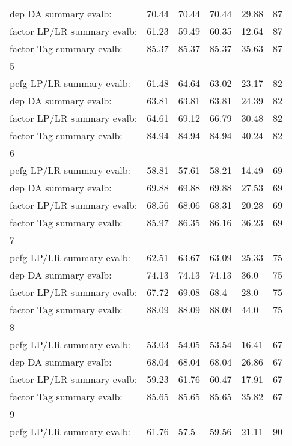 \begin{longtable}{|p{}|p{}|p{}|p{}|p{}|p{}|}
    dep DA summary evalb:  &  70.44  &  70.44  &  70.44  &  29.88  &  87\\
    factor LP/LR summary evalb:  &  61.23  &  59.49  &  60.35  &  12.64  &  87\\
    factor Tag summary evalb:  &  85.37  &  85.37  &  85.37  &  35.63  &  87\\
    5 & 	 & 	 & 	 & 	 & 	\\
    pcfg LP/LR summary evalb:  &  61.48  &  64.64  &  63.02  &  23.17  &  82\\
    dep DA summary evalb:  &  63.81  &  63.81  &  63.81  &  24.39  &  82\\
    factor LP/LR summary evalb:  &  64.61  &  69.12  &  66.79  &  30.48  &  82\\
    factor Tag summary evalb:  &  84.94  &  84.94  &  84.94  &  40.24  &  82\\
    6 & 	 & 	 & 	 & 	 & 	\\
    pcfg LP/LR summary evalb:  &  58.81  &  57.61  &  58.21  &  14.49  &  69\\
    dep DA summary evalb:  &  69.88  &  69.88  &  69.88  &  27.53  &  69\\
    factor LP/LR summary evalb:  &  68.56  &  68.06  &  68.31  &  20.28  &  69\\
    factor Tag summary evalb:  &  85.97  &  86.35  &  86.16  &  36.23  &  69\\
    7 & 	 & 	 & 	 & 	 & 	\\
    pcfg LP/LR summary evalb:  &  62.51  &  63.67  &  63.09  &  25.33  &  75\\
    dep DA summary evalb:  &  74.13  &  74.13  &  74.13  &  36.0  &  75\\
    factor LP/LR summary evalb:  &  67.72  &  69.08  &  68.4  &  28.0  &  75\\
    factor Tag summary evalb:  &  88.09  &  88.09  &  88.09  &  44.0  &  75\\
    8 & 	 & 	 & 	 & 	 & 	\\
    pcfg LP/LR summary evalb:  &  53.03  &  54.05  &  53.54  &  16.41  &  67\\
    dep DA summary evalb:  &  68.04  &  68.04  &  68.04  &  26.86  &  67\\
    factor LP/LR summary evalb:  &  59.23  &  61.76  &  60.47  &  17.91  &  67\\
    factor Tag summary evalb:  &  85.65  &  85.65  &  85.65  &  35.82  &  67\\
    9 & 	 & 	 & 	 & 	 & 	\\
    pcfg LP/LR summary evalb:  &  61.76  &  57.5  &  59.56  &  21.11  &  90\\

\end{longtable}
